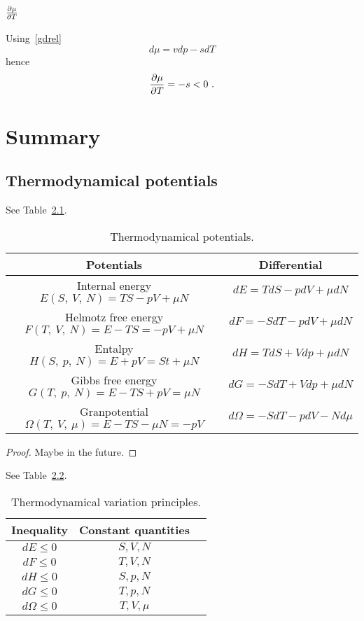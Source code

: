 \section{$\frac{\partial\mu}{\partial T}$}


    Using~\eqref{gdrel}
    \begin{equation*}
        d\mu = v dp - s dT
    \end{equation*}
    hence 
    \begin{equation*}
        \frac{\partial\mu}{\partial T} = - s < 0 ~.
    \end{equation*}

\chapter{Summary}

\section{Thermodynamical potentials}

    See Table~\ref{table:2}.

    \begin{table}[h!]
        \centering
        \begin{tabular}{c | c}
        Potentials & Differential \\
        \hline
        Internal energy $E(S, ~V, ~N) = TS - pV + \mu N$ & $dE = TdS - pdV + \mu dN$ \\ 
        Helmotz free energy $F(T, ~V, ~N) = E - TS = -pV + \mu N$ & $dF = -SdT - pdV + \mu dN$ \\ 
        Entalpy $H(S, ~p, ~N) = E + pV = St + \mu N$ & $dH = TdS + Vdp + \mu dN$ \\ 
        Gibbs free energy $G(T, ~p, ~N) = E - TS + pV = \mu N$ & $dG = -SdT + V dp + \mu dN$ \\ 
        Granpotential $\Omega (T, ~V, ~\mu) = E - TS - \mu N = -pV$ & $d\Omega = -SdT - pdV - N d \mu$ \\ 
        \end{tabular}
    \caption{Thermodynamical potentials.}
    \label{table:2}
    \end{table}

    \begin{proof}
        Maybe in the future.
    \end{proof}

    See Table~\ref{table:3}.

    \begin{table}[h!]
        \centering
        \begin{tabular}{c | c | c}
        Inequality & Constant quantities & \\
        \hline
        $d E \leq 0$ & $S, V, N$\\ 
        $d F \leq 0$ & $T, V, N$\\ 
        $d H \leq 0$ & $S, p, N$\\ 
        $d G \leq 0$ & $T, p, N$\\ 
        $d \Omega \leq 0$ & $T, V, \mu$\\ 
        \end{tabular}
    \caption{Thermodynamical variation principles.}
    \label{table:3}
    \end{table}
